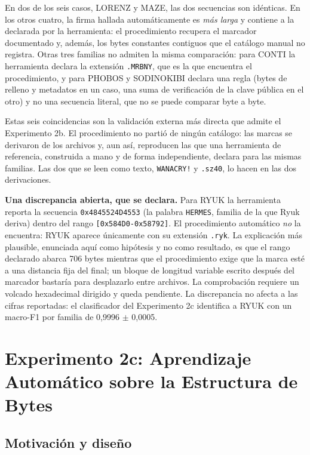 En dos de los seis casos, LORENZ y MAZE, las dos secuencias son idénticas. En los otros cuatro, la firma hallada automáticamente es \textit{más larga} y contiene a la declarada por la herramienta: el procedimiento recupera el marcador documentado y, además, los bytes constantes contiguos que el catálogo manual no registra. Otras tres familias no admiten la misma comparación: para CONTI la herramienta declara la extensión \texttt{.MRBNY}, que es la que encuentra el procedimiento, y para PHOBOS y SODINOKIBI declara una regla (bytes de relleno y metadatos en un caso, una suma de verificación de la clave pública en el otro) y no una secuencia literal, que no se puede comparar byte a byte.

Estas seis coincidencias son la validación externa más directa que admite el Experimento 2b. El procedimiento no partió de ningún catálogo: las marcas se derivaron de los archivos y, aun así, reproducen las que una herramienta de referencia, construida a mano y de forma independiente, declara para las mismas familias. Las dos que se leen como texto, \texttt{WANACRY!} y \texttt{.sz40}, lo hacen en las dos derivaciones.

\textbf{Una discrepancia abierta, que se declara.} Para RYUK la herramienta reporta la secuencia \texttt{0x4845524D4553} (la palabra \texttt{HERMES}, familia de la que Ryuk deriva) dentro del rango \texttt{[0x584D0-0x58792]}. El procedimiento automático \textit{no} la encuentra: RYUK aparece únicamente con su extensión \texttt{.ryk}. La explicación más plausible, enunciada aquí como hipótesis y no como resultado, es que el rango declarado abarca 706 bytes mientras que el procedimiento exige que la marca esté a una distancia fija del final; un bloque de longitud variable escrito después del marcador bastaría para desplazarlo entre archivos. La comprobación requiere un volcado hexadecimal dirigido y queda pendiente. La discrepancia no afecta a las cifras reportadas: el clasificador del Experimento 2c identifica a RYUK con un macro-F1 por familia de 0,9996 $\pm$ 0,0005.

\section{Experimento 2c: Aprendizaje Automático sobre la Estructura de Bytes}
\label{sec:exp2c}

\subsection{Motivación y diseño}


